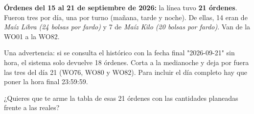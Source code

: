 \begin{singlespace}
{\textbf{Órdenes del 15 al 21 de septiembre de 2026:} la línea tuvo \textbf{21 órdenes}. Fueron tres por día, una por turno (mañana, tarde y noche). De ellas, 14 eran de \textit{Maíz Libra (24 bolsas por fardo)} y 7 de \textit{Maíz Kilo (20 bolsas por fardo)}. Van de la WO01 a la WO82.



Una advertencia: si se consulta el histórico con la fecha final "2026-09-21" sin hora, el sistema solo devuelve 18 órdenes. Corta a la medianoche y deja por fuera las tres del día 21 (WO76, WO80 y WO82). Para incluir el día completo hay que poner la hora final 23:59:59.



¿Quieres que te arme la tabla de esas 21 órdenes con las cantidades planeadas frente a las reales?}

\end{singlespace}
